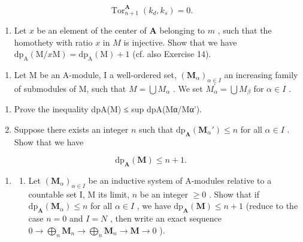 \[
\operatorname{Tor} _ {n + 1} ^ {\mathbf {A}} \left(k _ {d}, k _ {s}\right) = 0.
\]

\begin{enumerate}
\def\labelenumi{\alph{enumi})}
\setcounter{enumi}{2}
\tightlist
\item
  Let \(x\) be an element of the center of \(\mathbf{A}\) belonging to \(m\) , such that the homothety with ratio \(x\) in \(M\) is injective. Show that we have \(\mathrm{dp}_{\mathrm{A}}(\mathrm{M}/x\mathrm{M}) = \mathrm{dp}_{\mathrm{A}}(\mathrm{M}) + 1\) (cf. also Exercise 14).
\end{enumerate}

\begin{enumerate}
\def\labelenumi{\arabic{enumi})}
\setcounter{enumi}{16}
\tightlist
\item
  Let M be an A-module, I a well-ordered set, \((\mathbf{M}_{\alpha})_{\alpha \in I}\) an increasing family of submodules of M, such that \(M = \bigcup M_{\alpha}\) . We set \(M_{\alpha}^{\prime} = \bigcup M_{\beta}\) for \(\alpha \in I\) .
\end{enumerate}

\begin{enumerate}
\def\labelenumi{\alph{enumi})}
\item
  Prove the inequality dpA(M) ≤ sup dpA(Mα/Mα').
\item
  Suppose there exists an integer \(n\) such that \(\mathrm{dp}_{\mathbf{A}}(\mathbf{M}_{\alpha}') \leqslant n\) for all \(\alpha \in I\) . Show that we have
\end{enumerate}

\[
\mathrm{dp} _ {\mathbf {A}} (\mathbf {M}) \leqslant n + 1.
\]

\begin{enumerate}
\def\labelenumi{\arabic{enumi})}
\setcounter{enumi}{17}
\tightlist
\item
  \begin{enumerate}
  \def\labelenumii{\alph{enumii})}
  \tightlist
  \item
    Let \((\mathbf{M}_{\alpha})_{\alpha \in I}\) be an inductive system of A-modules relative to a countable set I, M its limit, \(n\) be an integer \(\geqslant 0\) . Show that if \(\mathrm{dp}_{\mathbf{A}}(\mathbf{M}_{\alpha}) \leqslant n\) for all \(\alpha \in I\) , we have \(\mathrm{dp}_{\mathbf{A}}(\mathbf{M}) \leqslant n + 1\) (reduce to the case \(n = 0\) and \(I = N\) , then write an exact sequence \(0 \to \bigoplus_{n} \mathbf{M}_{n} \to \bigoplus_{n} \mathbf{M}_{n} \to \mathbf{M} \to 0\) ).
  \end{enumerate}
\end{enumerate}

